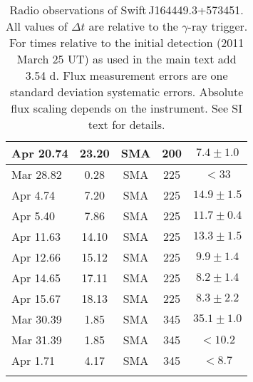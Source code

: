 \begin{center}
\begin{longtable}{lcccc}
Apr 20.74   & 23.20 & SMA & 200 & $7.4\pm 1.0$     \\\hline
%
Mar 28.82   & 0.28  & SMA & 225 & $<33$            \\
Apr 4.74    & 7.20  & SMA & 225 & $14.9\pm 1.5$    \\
Apr 5.40    & 7.86  & SMA & 225 & $11.7\pm 0.4$    \\
Apr 11.63   & 14.10 & SMA & 225 & $13.3\pm 1.5$    \\
Apr 12.66   & 15.12 & SMA & 225 & $9.9 \pm 1.4$    \\
Apr 14.65   & 17.11 & SMA & 225 & $8.2 \pm 1.4$    \\
Apr 15.67   & 18.13 & SMA & 225 & $8.3 \pm 2.2$    \\\hline
%
Mar 30.39   & 1.85 & SMA & 345   & $35.1\pm 1.0$  \\
Mar 31.39   & 1.85 & SMA & 345   & $<10.2$        \\
Apr 1.71    & 4.17 & SMA & 345   & $<8.7$         \\\hline
\caption[]{Radio observations of Swift\,J164449.3+573451.  All values
of $\Delta t$ are relative to the $\gamma$-ray trigger.  For times
relative to the initial detection (2011 March 25 UT) as used in the
main text add 3.54 d.  Flux measurement errors are one standard
deviation systematic errors.  Absolute flux scaling depends on the
instrument.  See SI text for details.}
\label{tab:radio}
\end{longtable}
\end{center}


